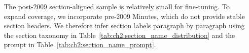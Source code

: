 The post-2009 section-aligned sample is relatively small for fine-tuning. To expand coverage, we incorporate pre-2009 Minutes, which do not provide stable section headers. We therefore infer section labels paragraph by paragraph using the section taxonomy in Table~\ref{tab:ch2:section_name_distribution} and the prompt in Table~\ref{tab:ch2:section_name_prompt}.


